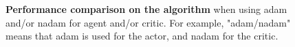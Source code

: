 \begin{figure}
%		
%			
%				
%		
%		
%			
\caption{\textbf{Performance comparison on the \ppo algorithm} when using adam and/or nadam for agent and/or critic. For example, "adam/nadam" means that adam is used for the actor, and nadam for the critic.} 
\label{fig:optimizer}
\end{figure} 
